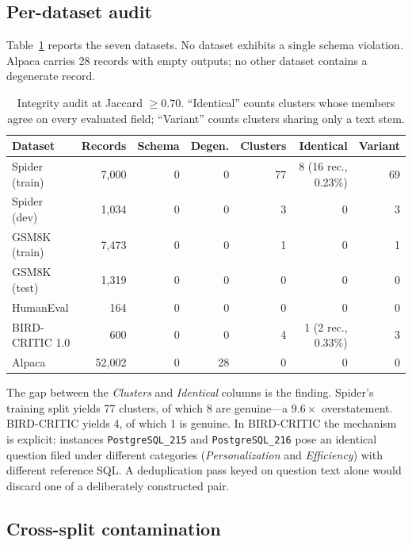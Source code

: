 \documentclass[11pt]{article}
\begin{document}
\subsection{Per-dataset audit}

Table~\ref{tab:main} reports the seven datasets. No dataset exhibits a single
schema violation. Alpaca carries 28 records with empty outputs; no other
dataset contains a degenerate record.

\begin{table}[h]
\centering
\small
\begin{tabular}{lrrrrrr}
\toprule
Dataset & Records & Schema & Degen. & Clusters & Identical & Variant \\
\midrule
Spider (train)        & 7{,}000  & 0 & 0  & 77 & 8 (16 rec., 0.23\%) & 69 \\
Spider (dev)          & 1{,}034  & 0 & 0  & 3  & 0 & 3 \\
GSM8K (train)         & 7{,}473  & 0 & 0  & 1  & 0 & 1 \\
GSM8K (test)          & 1{,}319  & 0 & 0  & 0  & 0 & 0 \\
HumanEval             & 164      & 0 & 0  & 0  & 0 & 0 \\
BIRD-CRITIC 1.0       & 600      & 0 & 0  & 4  & 1 (2 rec., 0.33\%)  & 3 \\
Alpaca                & 52{,}002 & 0 & 28 & 0  & 0 & 0 \\
\bottomrule
\end{tabular}
\caption{Integrity audit at Jaccard $\geq 0.70$. ``Identical'' counts clusters
whose members agree on every evaluated field; ``Variant'' counts clusters
sharing only a text stem.}
\label{tab:main}
\end{table}

The gap between the \emph{Clusters} and \emph{Identical} columns is the
finding. Spider's training split yields 77 clusters, of which 8 are genuine---a
$9.6\times$ overstatement. BIRD-CRITIC yields 4, of which 1 is genuine. In
BIRD-CRITIC the mechanism is explicit: instances \texttt{PostgreSQL\_215} and
\texttt{PostgreSQL\_216} pose an identical question filed under different
categories (\emph{Personalization} and \emph{Efficiency}) with different
reference SQL. A deduplication pass keyed on question text alone would discard
one of a deliberately constructed pair.

\subsection{Cross-split contamination}
\end{document}
